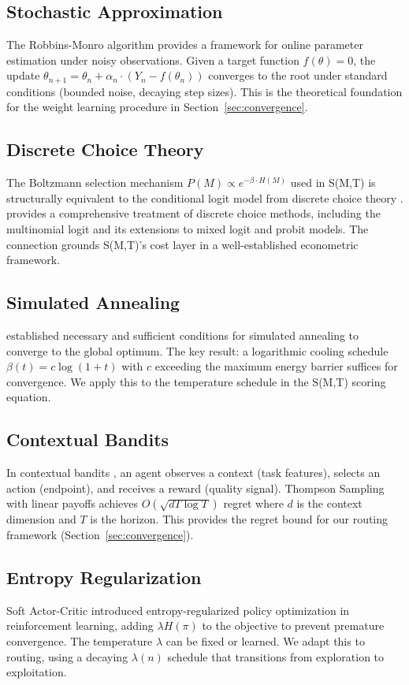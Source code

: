 \subsection{Stochastic Approximation}

The Robbins-Monro algorithm \citep{robbins1951stochastic} provides a framework for online parameter estimation under noisy observations. Given a target function $f(\theta) = 0$, the update $\theta_{n+1} = \theta_n + \alpha_n \cdot (Y_n - f(\theta_n))$ converges to the root under standard conditions (bounded noise, decaying step sizes). This is the theoretical foundation for the weight learning procedure in Section~\ref{sec:convergence}.

\subsection{Discrete Choice Theory}

The Boltzmann selection mechanism $P(M) \propto e^{-\beta \cdot H(M)}$ used in S(M,T) is structurally equivalent to the conditional logit model from discrete choice theory \citep{mcfadden1974conditional}. \citet{train2009discrete} provides a comprehensive treatment of discrete choice methods, including the multinomial logit and its extensions to mixed logit and probit models. The connection grounds S(M,T)'s cost layer in a well-established econometric framework.

\subsection{Simulated Annealing}

\citet{hajek1988cooling} established necessary and sufficient conditions for simulated annealing to converge to the global optimum. The key result: a logarithmic cooling schedule $\beta(t) = c \log(1+t)$ with $c$ exceeding the maximum energy barrier suffices for convergence. We apply this to the temperature schedule in the S(M,T) scoring equation.

\subsection{Contextual Bandits}

In contextual bandits \citep{agrawal2013thompson}, an agent observes a context (task features), selects an action (endpoint), and receives a reward (quality signal). Thompson Sampling with linear payoffs achieves $O(\sqrt{dT\log T})$ regret where $d$ is the context dimension and $T$ is the horizon. This provides the regret bound for our routing framework (Section~\ref{sec:convergence}).

\subsection{Entropy Regularization}

Soft Actor-Critic \citep{haarnoja2018sac} introduced entropy-regularized policy optimization in reinforcement learning, adding $\lambda H(\pi)$ to the objective to prevent premature convergence. The temperature $\lambda$ can be fixed or learned. We adapt this to routing, using a decaying $\lambda(n)$ schedule that transitions from exploration to exploitation.
